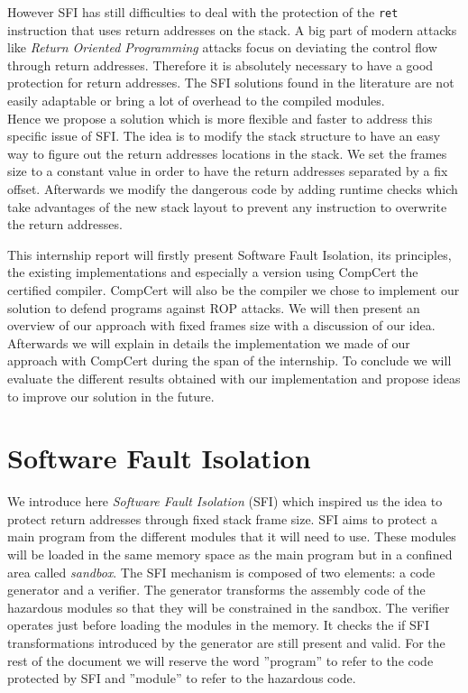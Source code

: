 \documentclass[11pt]{sdm}
\begin{document}
However SFI has still difficulties to deal with the protection of the \texttt{ret} instruction that uses return addresses on the stack. A big part of modern attacks like \textit{Return Oriented Programming} attacks focus on deviating the control flow through return addresses. Therefore it is absolutely necessary to have a good protection for return addresses. The SFI solutions found in the literature are not easily adaptable or bring a lot of overhead to the compiled modules. \\
Hence we propose a solution which is more flexible and faster to address this specific issue of SFI.
The idea is to modify the stack structure to have an easy way to figure out the return addresses locations in the stack.
We set the frames size to a constant value in order to have the return addresses separated by a fix offset. Afterwards we modify the dangerous code by adding runtime checks  which take advantages of the new stack layout to prevent any instruction to overwrite the return addresses. 

This internship report will firstly present Software Fault Isolation, its principles, the existing implementations and especially a version using CompCert the certified compiler. CompCert will also be the compiler we chose to implement our solution to defend programs against ROP attacks. We will then present an overview of our approach with fixed frames size with a discussion of our idea. Afterwards we will explain in details the implementation we made of our approach with CompCert during the span of the internship. To conclude we will evaluate the different results obtained with our implementation and propose ideas to improve our solution in the future.


\newpage
\section{Software Fault Isolation}
\label{sec:sfi}

	We introduce here \textit{Software Fault Isolation} (SFI) which inspired us the idea to protect return addresses through fixed stack frame size. SFI aims to protect a main program from the different modules that it will need to use. These modules will be loaded in the same memory space as the main program but in a confined area called \textit{sandbox}. The SFI mechanism is composed of two elements: a code generator and a verifier. The generator transforms the assembly code of the hazardous modules so that they will be constrained in the sandbox. The verifier operates just before loading the modules in the memory. It checks the if SFI transformations introduced by the generator are still present and valid. For the rest of the document we will reserve the word ''program'' to refer to the code protected by SFI and ''module'' to refer to the hazardous code.
\end{document}
